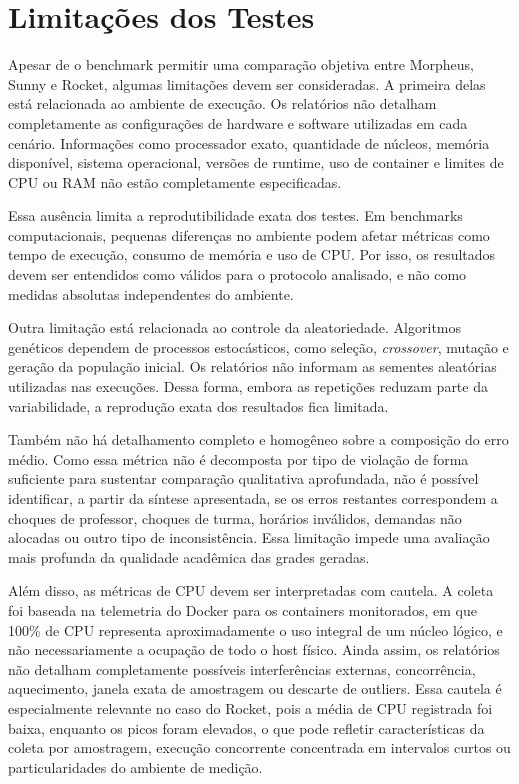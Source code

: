 \section{Limitações dos Testes}
\label{sec:limitacoes-testes}

Apesar de o benchmark permitir uma comparação objetiva entre Morpheus, Sunny e Rocket, algumas limitações devem ser consideradas. A primeira delas está relacionada ao ambiente de execução. Os relatórios não detalham completamente as configurações de hardware e software utilizadas em cada cenário. Informações como processador exato, quantidade de núcleos, memória disponível, sistema operacional, versões de runtime, uso de container e limites de CPU ou RAM não estão completamente especificadas.

Essa ausência limita a reprodutibilidade exata dos testes. Em benchmarks computacionais, pequenas diferenças no ambiente podem afetar métricas como tempo de execução, consumo de memória e uso de CPU. Por isso, os resultados devem ser entendidos como válidos para o protocolo analisado, e não como medidas absolutas independentes do ambiente.

Outra limitação está relacionada ao controle da aleatoriedade. Algoritmos genéticos dependem de processos estocásticos, como seleção, \textit{crossover}, mutação e geração da população inicial. Os relatórios não informam as sementes aleatórias utilizadas nas execuções. Dessa forma, embora as repetições reduzam parte da variabilidade, a reprodução exata dos resultados fica limitada.

Também não há detalhamento completo e homogêneo sobre a composição do erro médio. Como essa métrica não é decomposta por tipo de violação de forma suficiente para sustentar comparação qualitativa aprofundada, não é possível identificar, a partir da síntese apresentada, se os erros restantes correspondem a choques de professor, choques de turma, horários inválidos, demandas não alocadas ou outro tipo de inconsistência. Essa limitação impede uma avaliação mais profunda da qualidade acadêmica das grades geradas.

Além disso, as métricas de CPU devem ser interpretadas com cautela. A coleta foi baseada na telemetria do Docker para os containers monitorados, em que 100\% de CPU representa aproximadamente o uso integral de um núcleo lógico, e não necessariamente a ocupação de todo o host físico. Ainda assim, os relatórios não detalham completamente possíveis interferências externas, concorrência, aquecimento, janela exata de amostragem ou descarte de outliers. Essa cautela é especialmente relevante no caso do Rocket, pois a média de CPU registrada foi baixa, enquanto os picos foram elevados, o que pode refletir características da coleta por amostragem, execução concorrente concentrada em intervalos curtos ou particularidades do ambiente de medição.

